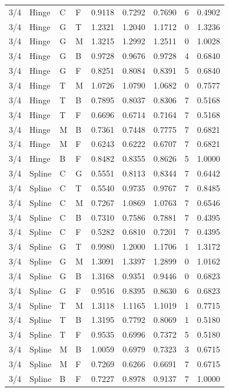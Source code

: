 \begin{longtable}{llllrrrrr}
3/4 & Hinge & C & F & 0.9118 & 0.7292 & 0.7690 & 6 & 0.4902 \\
3/4 & Hinge & G & T & 1.2321 & 1.2040 & 1.1712 & 0 & 1.3236 \\
3/4 & Hinge & G & M & 1.3215 & 1.2992 & 1.2511 & 0 & 1.0028 \\
3/4 & Hinge & G & B & 0.9728 & 0.9676 & 0.9728 & 4 & 0.6840 \\
3/4 & Hinge & G & F & 0.8251 & 0.8084 & 0.8391 & 5 & 0.6840 \\
3/4 & Hinge & T & M & 1.0726 & 1.0790 & 1.0682 & 0 & 0.7577 \\
3/4 & Hinge & T & B & 0.7895 & 0.8037 & 0.8306 & 7 & 0.5168 \\
3/4 & Hinge & T & F & 0.6696 & 0.6714 & 0.7164 & 7 & 0.5168 \\
3/4 & Hinge & M & B & 0.7361 & 0.7448 & 0.7775 & 7 & 0.6821 \\
3/4 & Hinge & M & F & 0.6243 & 0.6222 & 0.6707 & 7 & 0.6821 \\
3/4 & Hinge & B & F & 0.8482 & 0.8355 & 0.8626 & 5 & 1.0000 \\
3/4 & Spline & C & G & 0.5551 & 0.8113 & 0.8344 & 7 & 0.6442 \\
3/4 & Spline & C & T & 0.5540 & 0.9735 & 0.9767 & 7 & 0.8485 \\
3/4 & Spline & C & M & 0.7267 & 1.0869 & 1.0763 & 7 & 0.6546 \\
3/4 & Spline & C & B & 0.7310 & 0.7586 & 0.7881 & 7 & 0.4395 \\
3/4 & Spline & C & F & 0.5282 & 0.6810 & 0.7201 & 7 & 0.4395 \\
3/4 & Spline & G & T & 0.9980 & 1.2000 & 1.1706 & 1 & 1.3172 \\
3/4 & Spline & G & M & 1.3091 & 1.3397 & 1.2899 & 0 & 1.0162 \\
3/4 & Spline & G & B & 1.3168 & 0.9351 & 0.9446 & 0 & 0.6823 \\
3/4 & Spline & G & F & 0.9516 & 0.8395 & 0.8630 & 6 & 0.6823 \\
3/4 & Spline & T & M & 1.3118 & 1.1165 & 1.1019 & 1 & 0.7715 \\
3/4 & Spline & T & B & 1.3195 & 0.7792 & 0.8069 & 1 & 0.5180 \\
3/4 & Spline & T & F & 0.9535 & 0.6996 & 0.7372 & 5 & 0.5180 \\
3/4 & Spline & M & B & 1.0059 & 0.6979 & 0.7323 & 3 & 0.6715 \\
3/4 & Spline & M & F & 0.7269 & 0.6266 & 0.6691 & 7 & 0.6715 \\
3/4 & Spline & B & F & 0.7227 & 0.8978 & 0.9137 & 7 & 1.0000 \\

\end{longtable}
